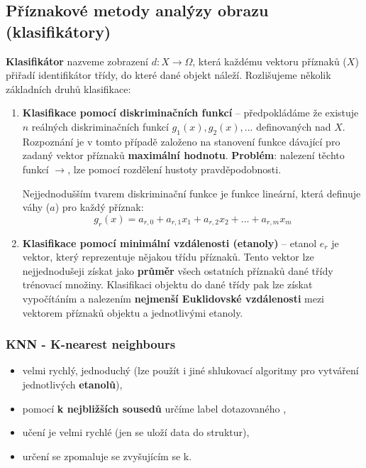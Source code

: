 \subsection{Příznakové metody analýzy obrazu (klasifikátory)}
\textbf{Klasifikátor} nazveme zobrazení $d: X \rightarrow \Omega$, která každému vektoru příznaků ($ X $) přiřadí identifikátor třídy, do které dané objekt náleží. Rozlišujeme několik základních druhů klasifikace:
\begin{enumerate}
\item \textbf{Klasifikace pomocí diskriminačních funkcí} -- předpokládáme že existuje $n$ reálných diskriminačních funkcí $g_1(x), g_2(x), ...$ definovaných nad $X$. Rozpoznání je v tomto případě založeno na stanovení funkce dávající pro zadaný vektor příznaků \textbf{maximální hodnotu}. \textbf{Problém}: nalezení těchto funkcí $\rightarrow$, lze pomocí rozdělení hustoty pravděpodobnosti.

Nejjednodušším tvarem diskriminační funkce je funkce lineární, která definuje váhy ($a$) pro každý příznak:
\begin{equation*}
g_r(x) = a_{r,0} + a_{r,1} x_1 + a_{r,2} x_2 + \ldots + a_{r,m}x_m
\end{equation*}
\item \textbf{Klasifikace pomocí minimální vzdálenosti (etanoly)} -- etanol $e_r$ je vektor, který reprezentuje nějakou třídu příznaků. Tento vektor lze nejjednodušeji získat jako \textbf{průměr} všech ostatních příznaků dané třídy trénovací množiny. Klasifikaci objektu do dané třídy pak lze získat vypočítáním a nalezením \textbf{nejmenší Euklidovské vzdálenosti} mezi vektorem příznaků objektu a jednotlivými etanoly.
\end{enumerate}

\subsubsection{KNN - K-nearest neighbours}
\begin{itemize}
	\item velmi rychlý, jednoduchý (lze použít i jiné shlukovací algoritmy pro vytváření jednotlivých \textbf{etanolů}),
	\item pomocí \textbf{k nejbližších sousedů} určíme label dotazovaného ,
	\item učení je velmi rychlé (jen se uloží data do struktur),
	\item určení se zpomaluje se zvyšujícím se k.
\end{itemize}

